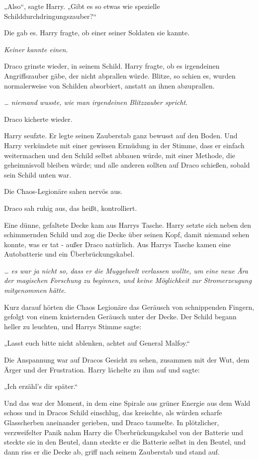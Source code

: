 {„Also“, sagte Harry. „Gibt es so etwas wie spezielle Schilddurchdringungszauber?“

Die gab es. Harry fragte, ob einer seiner Soldaten sie kannte.

\emph{Keiner kannte einen.}

Draco grinste wieder, in seinem Schild. Harry fragte, ob es irgendeinen Angriffszauber gäbe, der nicht abprallen würde. Blitze, so schien es, wurden normalerweise von Schilden absorbiert, anstatt an ihnen abzuprallen.

\emph{… niemand wusste, wie man irgendeinen Blitzzauber spricht}.

Draco kicherte wieder.

Harry seufzte. Er legte seinen Zauberstab ganz bewusst auf den Boden. Und Harry verkündete mit einer gewissen Ermüdung in der Stimme, dass er einfach weitermachen und den Schild selbst abbauen würde, mit einer Methode, die geheimnisvoll bleiben würde; und alle anderen sollten auf Draco schießen, sobald sein Schild unten war.

Die Chaos-Legionäre sahen nervös aus.

Draco sah ruhig aus, das heißt, kontrolliert.

Eine dünne, gefaltete Decke kam aus Harrys Tasche. Harry setzte sich neben den schimmernden Schild und zog die Decke über seinen Kopf, damit niemand sehen konnte, was er tat - außer Draco natürlich. Aus Harrys Tasche kamen eine Autobatterie und ein Überbrückungskabel.

\emph{… es war ja nicht so, dass er die Muggelwelt verlassen wollte, um eine neue Ära der magischen Forschung zu beginnen, und keine Möglichkeit zur Stromerzeugung mitgenommen hätte.}

Kurz darauf hörten die Chaos Legionäre das Geräusch von schnippenden Fingern, gefolgt von einem knisternden Geräusch unter der Decke. Der Schild begann heller zu leuchten, und Harrys Stimme sagte:

„Lasst euch bitte nicht ablenken, achtet auf General Malfoy.“

Die Anspannung war auf Dracos Gesicht zu sehen, zusammen mit der Wut, dem Ärger und der Frustration. Harry lächelte zu ihm auf und sagte:

„Ich erzähl's dir später.“

Und das war der Moment, in dem eine Spirale aus grüner Energie aus dem Wald schoss und in Dracos Schild einschlug, das kreischte, als würden scharfe Glasscherben aneinander gerieben, und Draco taumelte. In plötzlicher, verzweifelter Panik nahm Harry die Überbrückungskabel von der Batterie und steckte sie in den Beutel, dann steckte er die Batterie selbst in den Beutel, und dann riss er die Decke ab, griff nach seinem Zauberstab und stand auf.

}
